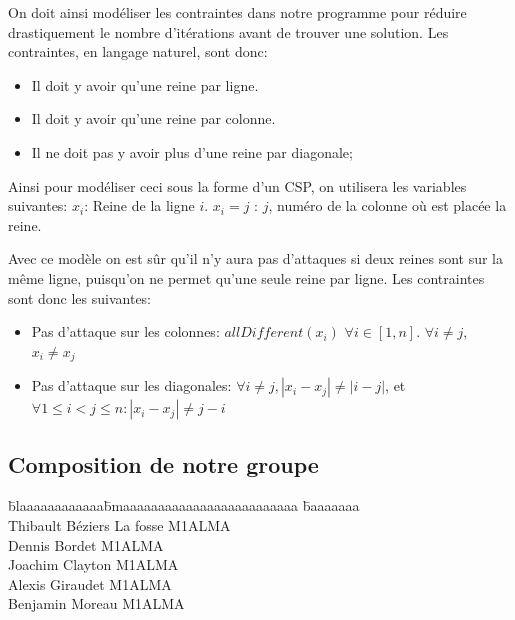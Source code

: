 \documentclass{article}
\begin{document}
On doit ainsi modéliser les contraintes dans notre programme pour réduire drastiquement le nombre d'itérations avant de trouver une solution. Les contraintes, en langage naturel, sont donc:

\begin{itemize}
\item Il doit y avoir qu'une reine par ligne.
\item Il doit y avoir qu'une reine par colonne.
\item Il ne doit pas y avoir plus d'une reine par diagonale;
\end{itemize}

Ainsi pour modéliser ceci sous la forme d'un CSP, on utilisera les variables suivantes:
$x_i$: Reine de la ligne $i$.
$x_i = j$ : $j$, numéro de la colonne où est placée la reine.

Avec ce modèle on est sûr qu'il n'y aura pas d'attaques si deux reines sont sur la même ligne, puisqu'on ne permet qu'une seule reine par ligne.
Les contraintes sont donc les suivantes:
\begin{itemize}
\item Pas d'attaque sur les colonnes: $allDifferent(x_i)$ $\forall i \in [1, n]$. $\forall i \neq j$, $x_i \neq x_j$

\item Pas d'attaque sur les diagonales:  $\forall i \neq j, |x_i - x_j| \neq |i - j|$, et $\forall  1 \leq i < j \leq n : |x_i - x_j | \neq j - i$
\end{itemize}


\newpage
\subsection{Composition de notre groupe}

\vspace{1cm}

\begin{tabbing}


\=blaaaaaaaaaaaa\=bmaaaaaaaaaaaaaaaaaaaaaaaaa   \=baaaaaaa\kill \\
\>Thibault 	\>Béziers La fosse		\>M1ALMA\\
\>Dennis	\>Bordet			\>M1ALMA\\
\>Joachim	\>Clayton			\>M1ALMA\\
\>Alexis	\>Giraudet			\>M1ALMA\\
\>Benjamin 	\>Moreau			\>M1ALMA\\


\end{tabbing}
\end{document}

